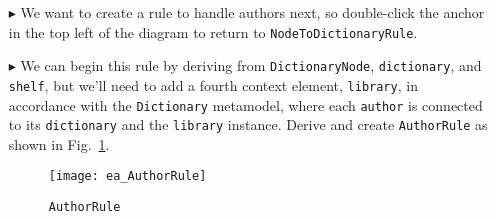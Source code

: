 \begin{itemize}
You can see that for every \texttt{entryNode}, \texttt{contentNode} and \texttt{indexNode} child elements are also created. When transforming from a tree to
dictionary, these are identified by their 0 and 1 indices. As such, the rule's first two constraints are used to ensure that this information is not
lost, guaranteeing their correct positions in the tree when transforming back.

\vspace{0.5cm}

The final constraint however, is one we haven't used before. If you re-examine your source \texttt{tree.xmi} model, you'll notice that every entry has a
different \texttt{index} value. This prevented us from setting an attribute constraint on \texttt{entryNode} but, as long as its index wasn't 0 indicating a
\texttt{titleNode} (as constrained in the previous \texttt{Node\-To\-Dictionary\-Rule}), it didn't matter. Unfortunately, this missing information means any new \texttt{entryNode}s created in the backward transformation have a default 0 index value, and \emph{could} be mistaken by the rule. By using
\texttt{setDefaultNumber}, we have declared that any created default \texttt{index} attributes must be set to 2.

\subsubsection{AuthorRule} %

\item[$\blacktriangleright$] We want to create a rule to handle authors next, so double-click the anchor in the top left of the diagram to return to
\texttt{NodeToDictionaryRule}.

\item[$\blacktriangleright$] We can begin this rule by deriving from \texttt{DictionaryNode}, \texttt{dictionary}, and \texttt{shelf}, but we'll need to add a
fourth context element, \texttt{library}, in accordance with the \texttt{Dictionary} metamodel, where each \texttt{author} is connected to its \texttt{dictionary} and
the \texttt{library} instance. Derive and create \texttt{AuthorRule} as shown in Fig.~\ref{ea:AuthorRule}.

\vspace{0.5cm}

\begin{figure}[h]
  \hspace{-0.5cm}
  \texttt{[image: ea\_AuthorRule]}
  \caption{\texttt{AuthorRule}}
  \label{ea:AuthorRule}
\end{figure}

\end{itemize}

